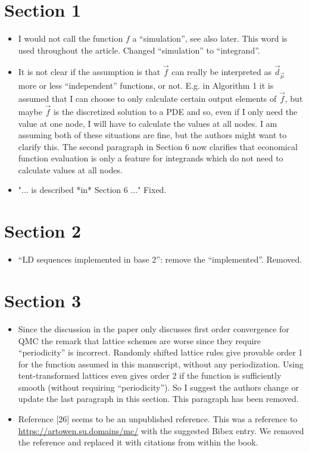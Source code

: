 \documentclass{article}[12pt]
\newcommand{\Referee}[1]{{\color{blue} #1 \newline}}
\begin{document}
\section*{Section 1}

\begin{itemize}
    \item \Referee{I would not call the function $f$ a ``simulation'', see also later. This word is used throughout the article.}Changed ``simulation'' to ``integrand''.
    \item \Referee{It is not clear if the assumption is that $\vec{f}$ can really be interpreted as $\vec{d}_{\vec{\mu}}$ more or less ``independent'' functions, or not. E.g. in Algorithm 1 it is assumed that I can choose to only calculate certain output elements of $\vec{f}$, but maybe $\vec{f}$ is the discretized solution to a PDE and so, even if I only need the value at one node, I will have to calculate the values at all nodes. I am assuming both of these situations are fine, but the authors might want to clarify this.}The second paragraph in Section 6 now clarifies that economical function evaluation is only a feature for integrands which do not need to calculate values at all nodes. 
    \item \Referee{"... is described *in* Section 6 ..."}Fixed. 
\end{itemize}

\section*{Section 2}

\begin{itemize}
    \item \Referee{``LD sequences implemented in base 2'': remove the ``implemented''.}Removed. 
\end{itemize}

\section*{Section 3}

\begin{itemize}
    \item \Referee{Since the discussion in the paper only discusses first order convergence for QMC the remark that lattice schemes are worse since they require ``periodicity'' is incorrect. Randomly shifted lattice rules give provable order 1 for the function assumed in this manuscript, without any periodization. Using tent-transformed lattices even gives order 2 if the function is sufficiently smooth (without requiring ``periodicity''). So I suggest the authors change or update the last paragraph in this section.}This paragraph has been removed.
    \item \Referee{Reference [26] seems to be an unpublished reference.}This was a reference to \url{https://artowen.su.domains/mc/} with the suggested Bibex entry. We removed the reference and replaced it with citations from within the book.  
\end{itemize}
\end{document}
